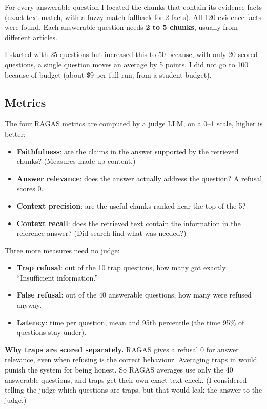 \documentclass[10pt,twocolumn]{article}
\newcommand{\term}[1]{\textbf{#1}}
\begin{document}
For every answerable question I located the chunks that contain its evidence facts (exact text match, with a fuzzy-match fallback for 2 facts). All 120 evidence facts were found. Each answerable question needs \textbf{2 to 5 chunks}, usually from different articles.

I started with 25 questions but increased this to 50 because, with only 20 scored questions, a single question moves an average by 5 points. I did not go to 100 because of budget (about \$9 per full run, from a student budget).

\subsection{Metrics}\label{sec:metrics}
The four RAGAS metrics are computed by a judge LLM, on a 0--1 scale, higher is better:

\begin{itemize}
\item \term{Faithfulness}: are the claims in the answer supported by the retrieved chunks? (Measures made-up content.)
\item \term{Answer relevance}: does the answer actually address the question? A refusal scores 0.
\item \term{Context precision}: are the useful chunks ranked near the top of the 5?
\item \term{Context recall}: does the retrieved text contain the information in the reference answer? (Did search find what was needed?)
\end{itemize}

Three more measures need no judge:

\begin{itemize}
\item \term{Trap refusal}: out of the 10 trap questions, how many got exactly ``Insufficient information.''
\item \term{False refusal}: out of the 40 answerable questions, how many were refused anyway.
\item \term{Latency}: time per question, mean and 95th percentile (the time 95\% of questions stay under).
\end{itemize}

\textbf{Why traps are scored separately.} RAGAS gives a refusal 0 for answer relevance, even when refusing is the correct behaviour. Averaging traps in would punish the system for being honest. So RAGAS averages use only the 40 answerable questions, and traps get their own exact-text check. (I considered telling the judge which questions are traps, but that would leak the answer to the judge.)
\end{document}
